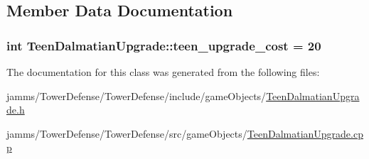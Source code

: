 \subsection{Member Data Documentation}
\hypertarget{class_teen_dalmatian_upgrade_ad04d41f026f65e76d5be1d2272b1bc4c}{
\subsubsection[{teen\+\_\+upgrade\+\_\+cost}]{\setlength{\rightskip}{0pt plus 5cm}int Teen\+Dalmatian\+Upgrade\+::teen\+\_\+upgrade\+\_\+cost = 20\hspace{0.3cm}{\ttfamily [static]}}}\label{class_teen_dalmatian_upgrade_ad04d41f026f65e76d5be1d2272b1bc4c}


The documentation for this class was generated from the following files\+:\begin{DoxyCompactItemize}
\item 
jamms/\+Tower\+Defense/\+Tower\+Defense/include/game\+Objects/\hyperlink{_teen_dalmatian_upgrade_8h}{Teen\+Dalmatian\+Upgrade.\+h}\item 
jamms/\+Tower\+Defense/\+Tower\+Defense/src/game\+Objects/\hyperlink{_teen_dalmatian_upgrade_8cpp}{Teen\+Dalmatian\+Upgrade.\+cpp}\end{DoxyCompactItemize}
